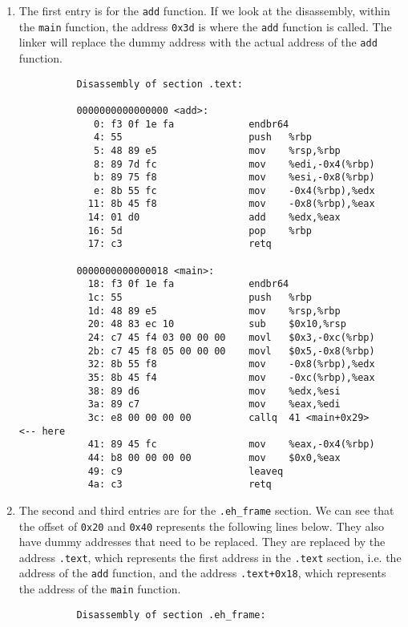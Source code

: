       \begin{enumerate}
        \item The first entry is for the \texttt{add} function. If we look at the disassembly, within the \texttt{main} function, the address \texttt{0x3d} is where the \texttt{add} function is called. The linker will replace the dummy address with the actual address of the \texttt{add} function.
        \begin{lstlisting}
          Disassembly of section .text:

          0000000000000000 <add>:
             0:	f3 0f 1e fa          	endbr64 
             4:	55                   	push   %rbp
             5:	48 89 e5             	mov    %rsp,%rbp
             8:	89 7d fc             	mov    %edi,-0x4(%rbp)
             b:	89 75 f8             	mov    %esi,-0x8(%rbp)
             e:	8b 55 fc             	mov    -0x4(%rbp),%edx
            11:	8b 45 f8             	mov    -0x8(%rbp),%eax
            14:	01 d0                	add    %edx,%eax
            16:	5d                   	pop    %rbp
            17:	c3                   	retq   

          0000000000000018 <main>:
            18:	f3 0f 1e fa          	endbr64 
            1c:	55                   	push   %rbp
            1d:	48 89 e5             	mov    %rsp,%rbp
            20:	48 83 ec 10          	sub    $0x10,%rsp
            24:	c7 45 f4 03 00 00 00 	movl   $0x3,-0xc(%rbp)
            2b:	c7 45 f8 05 00 00 00 	movl   $0x5,-0x8(%rbp)
            32:	8b 55 f8             	mov    -0x8(%rbp),%edx
            35:	8b 45 f4             	mov    -0xc(%rbp),%eax
            38:	89 d6                	mov    %edx,%esi
            3a:	89 c7                	mov    %eax,%edi
            3c:	e8 00 00 00 00       	callq  41 <main+0x29>     <-- here
            41:	89 45 fc             	mov    %eax,-0x4(%rbp)
            44:	b8 00 00 00 00       	mov    $0x0,%eax
            49:	c9                   	leaveq 
            4a:	c3                   	retq  
        \end{lstlisting}
        \item The second and third entries are for the \texttt{.eh\_frame} section. We can see that the offset of \texttt{0x20} and \texttt{0x40} represents the following lines below. They also have dummy addresses that need to be replaced. They are replaced by the address \texttt{.text}, which represents the first address in the \texttt{.text} section, i.e. the address of the \texttt{add} function, and the address \texttt{.text+0x18}, which represents the address of the \texttt{main} function.
        \begin{lstlisting}
          Disassembly of section .eh_frame:


\end{lstlisting}
\end{enumerate}
